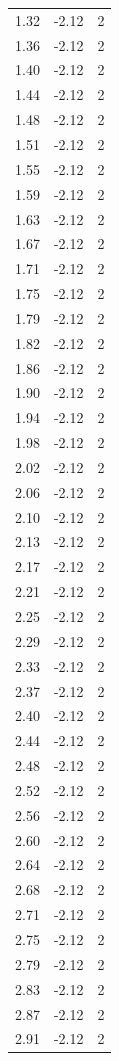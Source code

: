 \begin{longtable}{lrr}
  1.32 & -2.12 & 2 \\
  1.36 & -2.12 & 2 \\
  1.40 & -2.12 & 2 \\
  1.44 & -2.12 & 2 \\
  1.48 & -2.12 & 2 \\
  1.51 & -2.12 & 2 \\
  1.55 & -2.12 & 2 \\
  1.59 & -2.12 & 2 \\
  1.63 & -2.12 & 2 \\
  1.67 & -2.12 & 2 \\
  1.71 & -2.12 & 2 \\
  1.75 & -2.12 & 2 \\
  1.79 & -2.12 & 2 \\
  1.82 & -2.12 & 2 \\
  1.86 & -2.12 & 2 \\
  1.90 & -2.12 & 2 \\
  1.94 & -2.12 & 2 \\
  1.98 & -2.12 & 2 \\
  2.02 & -2.12 & 2 \\
  2.06 & -2.12 & 2 \\
  2.10 & -2.12 & 2 \\
  2.13 & -2.12 & 2 \\
  2.17 & -2.12 & 2 \\
  2.21 & -2.12 & 2 \\
  2.25 & -2.12 & 2 \\
  2.29 & -2.12 & 2 \\
  2.33 & -2.12 & 2 \\
  2.37 & -2.12 & 2 \\
  2.40 & -2.12 & 2 \\
  2.44 & -2.12 & 2 \\
  2.48 & -2.12 & 2 \\
  2.52 & -2.12 & 2 \\
  2.56 & -2.12 & 2 \\
  2.60 & -2.12 & 2 \\
  2.64 & -2.12 & 2 \\
  2.68 & -2.12 & 2 \\
  2.71 & -2.12 & 2 \\
  2.75 & -2.12 & 2 \\
  2.79 & -2.12 & 2 \\
  2.83 & -2.12 & 2 \\
  2.87 & -2.12 & 2 \\
  2.91 & -2.12 & 2 \\

\end{longtable}
